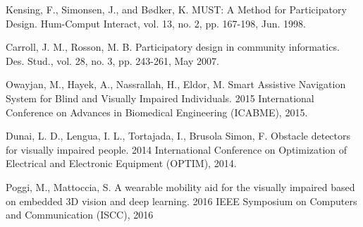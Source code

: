 \documentclass[10pt,conference,compsocconf]{IEEEtran}
\begin{document}
\begin{thebibliography}{1}
 Kensing, F., Simonsen, J., and B\o dker, K. MUST: A Method for Participatory Design. Hum-Comput Interact, vol. 13, no. 2, pp. 167-198, Jun. 1998.

 Carroll, J. M., Rosson, M. B. Participatory design in community informatics. Des. Stud., vol. 28, no. 3, pp. 243-261, May 2007.

 Owayjan, M., Hayek, A., Nassrallah, H., Eldor, M. Smart Assistive Navigation System for Blind and Visually Impaired Individuals. 2015 International Conference on Advances in Biomedical Engineering (ICABME), 2015.

 Dunai, L. D., Lengua, I. L., Tortajada, I., Brusola Simon, F. Obstacle detectors for visually impaired people. 2014 International Conference on Optimization of Electrical and Electronic Equipment (OPTIM), 2014. 

 Poggi, M., Mattoccia, S. A wearable mobility aid for the visually impaired based on embedded 3D vision and deep learning. 2016 IEEE Symposium on Computers and Communication (ISCC), 2016

\end{thebibliography}




\end{document}
